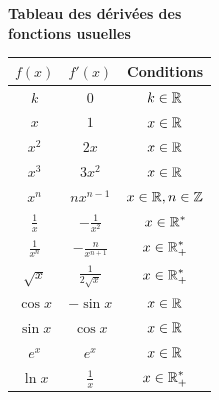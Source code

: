 \documentclass[oneside,12pt]{book}          %
\begin{document}



\newpage

\begin{minipage}[t]{0.44\textwidth}
\center
\textbf{\large Tableau des dérivées des\\fonctions usuelles}\\[10pt]
\renewcommand{\arraystretch}{1.5}
\begin{tabular}{ | c | c | c |}
   \hline
   
 $f(x)$ & $f'(x)$ & Conditions \\ \hline \hline
 $k$ & $0$ & $k\in{\mathbb R}$ \\ \hline
 $x$ & $1$& ${x\in\mathbb R}$\\ \hline
 $x^{2}$ & $2x$& ${x\in\mathbb R}$\\ \hline
 $x^{3}$ & $3x^{2}$& ${x\in\mathbb R}$\\ \hline
 $x^{n}$ & $nx^{n-1}$ & ${x\in\mathbb R} , n\in {\mathbb Z}$\\ \hline
 $\frac{1}{x}$ & $-\frac{1}{x^{2}}$ & ${x\in\mathbb R}^{*}$ \\ \hline
 $\frac{1}{x^{n}}$ & $-\frac{n}{x^{n+1}}$ & ${x\in\mathbb R}_{+}^{*}$ \\ \hline
 $\sqrt{x}$ & $\frac{1}{2\sqrt{x}}$ & ${x\in\mathbb R}^{*}_{+}$ \\ \hline
 $\cos{x}$ & $-\sin{x}$ & ${x\in\mathbb R}$ \\ \hline
 $\sin{x}$ & $\cos{x}$ & ${x\in\mathbb R}$ \\ \hline
 $e^{x}$ & $e^{x}$ & ${x\in\mathbb R}$ \\ \hline
 $\ln{x}$ & $\frac{1}{x}$ & ${x\in\mathbb R}^{*}_{+}$ \\ \hline
   
 \end{tabular}
 
\end{minipage}
\end{document}
